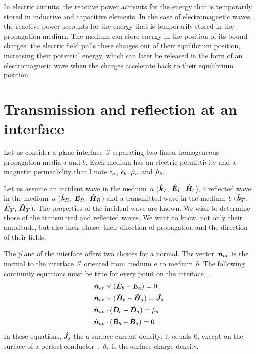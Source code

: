In electric circuits, the reactive power accounts for the energy that is temporarily stored in inductive and capacitive elements.
In the case of electromagnetic waves, the reactive power accounts for the energy that is temporarily stored in the propagation medium.
The medium can store energy in the position of its bound charges: the electric field pulls these charges out of their equilibrium position, increasing their potential energy, which can later be released in the form of an electromagnetic wave when the charges accelerate back to their equilibrium position.



\FloatBarrier


\section{Transmission and reflection at an interface}
\label{sec:transmission_reflection_interface}

Let us consider a plane interface~$\mathcal{I}$ separating two linear homogeneous propagation media $a$ and $b$.
Each medium has an electric permittivity and a magnetic permeability that I note $\hat{\epsilon}_a$, $\hat{\epsilon}_b$, $\hat{\mu}_a$ and $\hat{\mu}_b$.

Let us assume
an incident wave in the medium~$a$ ($\hat{\bm{k}}_I$, $\hat{\bm{E}}_I$, $\hat{\bm{H}}_I$),
a reflected wave in the medium~$a$ ($\hat{\bm{k}}_R$, $\hat{\bm{E}}_R$, $\hat{\bm{H}}_R$)
and a transmitted wave in the medium~$b$ ($\hat{\bm{k}}_T$, $\hat{\bm{E}}_T$, $\hat{\bm{H}}_T$).
The properties of the incident wave are known.
We wish to determine those of the transmitted and reflected waves.
We want to know, not only their amplitude, but also their phase, their direction of propagation and the direction of their fields.

The plane of the interface offers two choices for a normal.
The vector~$\dot{\bm{n}}_{ab}$ is the normal to the interface~$\mathcal{I}$ oriented from medium $a$ to medium~$b$.
The following continuity equations must be true for every point on the interface~\parencite{stratton1941electromagnetic}.
\begin{align}
    &\dot{\bm{n}}_{ab} \times (\hat{\bm{E}}_b - \hat{\bm{E}}_a) = 0 \\
    &\dot{\bm{n}}_{ab} \times (\hat{\bm{H}}_b - \hat{\bm{H}}_a) = \hat{\bm{J}}_s \\
    &\dot{\bm{n}}_{ab} \cdot  (\hat{\bm{D}}_b - \hat{\bm{D}}_a) = \hat{\rho}_s \\
    &\dot{\bm{n}}_{ab} \cdot  (\hat{\bm{B}}_b - \hat{\bm{B}}_a) = 0
\end{align}
In these equations, $\hat{\bm{J}}_s$ the a surface current density;
it equals~0, except on the surface of a perfect conductor~\parencite{stratton1941electromagnetic}.
$\hat{\rho}_s$ is the surface charge density.

